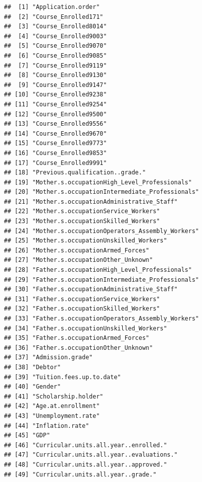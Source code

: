 \documentclass[
]{article}
\begin{document}
\begin{verbatim}
##  [1] "Application.order"                            
##  [2] "Course_Enrolled171"                           
##  [3] "Course_Enrolled8014"                          
##  [4] "Course_Enrolled9003"                          
##  [5] "Course_Enrolled9070"                          
##  [6] "Course_Enrolled9085"                          
##  [7] "Course_Enrolled9119"                          
##  [8] "Course_Enrolled9130"                          
##  [9] "Course_Enrolled9147"                          
## [10] "Course_Enrolled9238"                          
## [11] "Course_Enrolled9254"                          
## [12] "Course_Enrolled9500"                          
## [13] "Course_Enrolled9556"                          
## [14] "Course_Enrolled9670"                          
## [15] "Course_Enrolled9773"                          
## [16] "Course_Enrolled9853"                          
## [17] "Course_Enrolled9991"                          
## [18] "Previous.qualification..grade."               
## [19] "Mother.s.occupationHigh_Level_Professionals"  
## [20] "Mother.s.occupationIntermediate_Professionals"
## [21] "Mother.s.occupationAdministrative_Staff"      
## [22] "Mother.s.occupationService_Workers"           
## [23] "Mother.s.occupationSkilled_Workers"           
## [24] "Mother.s.occupationOperators_Assembly_Workers"
## [25] "Mother.s.occupationUnskilled_Workers"         
## [26] "Mother.s.occupationArmed_Forces"              
## [27] "Mother.s.occupationOther_Unknown"             
## [28] "Father.s.occupationHigh_Level_Professionals"  
## [29] "Father.s.occupationIntermediate_Professionals"
## [30] "Father.s.occupationAdministrative_Staff"      
## [31] "Father.s.occupationService_Workers"           
## [32] "Father.s.occupationSkilled_Workers"           
## [33] "Father.s.occupationOperators_Assembly_Workers"
## [34] "Father.s.occupationUnskilled_Workers"         
## [35] "Father.s.occupationArmed_Forces"              
## [36] "Father.s.occupationOther_Unknown"             
## [37] "Admission.grade"                              
## [38] "Debtor"                                       
## [39] "Tuition.fees.up.to.date"                      
## [40] "Gender"                                       
## [41] "Scholarship.holder"                           
## [42] "Age.at.enrollment"                            
## [43] "Unemployment.rate"                            
## [44] "Inflation.rate"                               
## [45] "GDP"                                          
## [46] "Curricular.units.all.year..enrolled."         
## [47] "Curricular.units.all.year..evaluations."      
## [48] "Curricular.units.all.year..approved."         
## [49] "Curricular.units.all.year..grade."
\end{verbatim}
\end{document}
